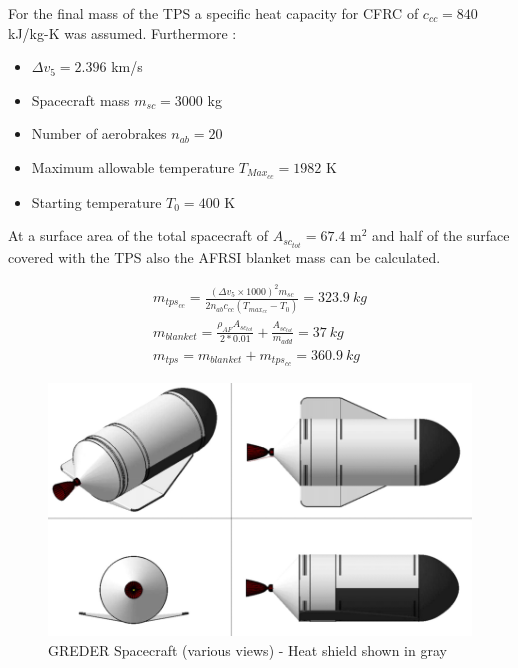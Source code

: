 \qquad For the final mass of the TPS a specific heat capacity for CFRC of $c_{cc} = 840$ kJ/kg-K was assumed. Furthermore :

\begin{itemize}
	\item $\Delta v_5=2.396$ km/s
	\item Spacecraft mass $m_{sc}=3000$ kg
	\item Number of aerobrakes $n_{ab}=20$
	\item Maximum allowable temperature $T_{Max_{cc}} = 1982$ K
	\item Starting temperature $T_0=400$ K
\end{itemize}
At a surface area of the total spacecraft of $A_{sc_{tot}} = 67.4$ m$^2$ and half of the
surface covered with the TPS also the AFRSI blanket mass can be calculated.

\begin{align}
	m_{tps_{cc}} = \frac{(\Delta v_5\times 1000)^2m_{sc}}{2n_{ab}c_{cc}(T_{max_{cc}} - T_0)} = 323.9\ kg\\
	m_{blanket}=\frac{\rho_{AF}A_{sc_{tot}}}{2*0.01} + \frac{A_{sc_{tot}}}{m_{add}} = 37\ kg\\
	m_{tps} = m_{blanket} + m_{tps_{cc}} = 360.9\ kg
\end{align}
\begin{figure}[H]
	\centering\includegraphics[width=\linewidth]{grederviews}
	\caption{GREDER Spacecraft (various views) - Heat shield shown in gray}\label{fig:grederview}
\end{figure}